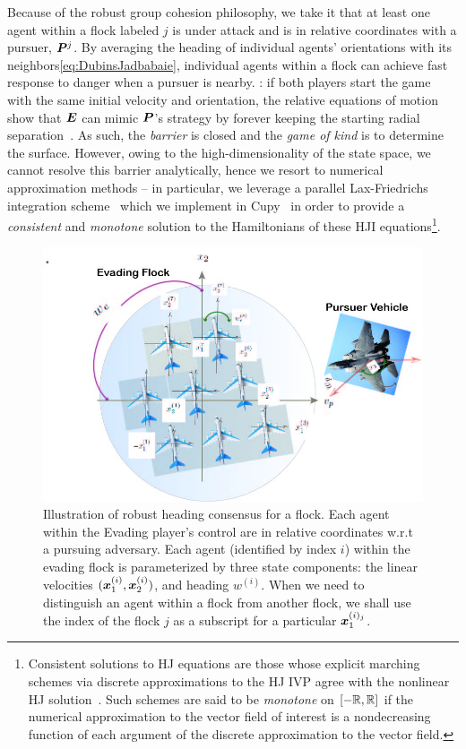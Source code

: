 Because of the robust group cohesion philosophy, we take it that at least one agent within a flock labeled $j$ is under attack and is in relative coordinates with a pursuer, $\bm{P}^j$. By averaging the heading of individual agents' orientations with its neighbors\cf \eqref{eq:DubinsJadbabaie}, individual agents within a flock can achieve  fast  response to danger when a pursuer is nearby. : if both players start the game with the same initial velocity and orientation, the relative equations of motion show that $\bm{E}$ can mimic $\bm{P}$'s strategy by forever keeping the starting radial separation~\cite{Merz1972}. As such, the \textit{barrier} is closed and the \textit{game of kind} is to determine the surface. However, owing to the high-dimensionality of the state space, we cannot resolve this barrier analytically, hence we resort to numerical approximation methods -- in particular, we leverage a parallel Lax-Friedrichs integration scheme~\cite{Crandall1984} which we implement in Cupy~\cite{CuPy} in order to provide a \textit{consistent} and \textit{monotone} solution to the Hamiltonians of these HJI equations\footnote{Consistent solutions to HJ equations are those whose explicit marching schemes via discrete  approximations to the HJ IVP agree with the nonlinear HJ solution~\cite{Crandall1984Approx}. Such schemes are said to be \textit{monotone} \eg on $\left[-\mathbb{R}, \mathbb{R}\right]$ if the numerical approximation to the vector field of interest is a nondecreasing function of each argument of the discrete approximation to the vector field.}. 
%
\begin{figure}[tb!]
\centering
\includegraphics[width=\columnwidth]{figures/flock_pursuer.jpg}
\caption{Illustration of robust heading consensus for a flock. Each agent within the Evading player's control are in relative coordinates w.r.t a pursuing adversary. Each agent (identified by index $i$) within the evading flock is parameterized by three state components: the linear velocities $(\bm{x}_1^{(i)}, \bm{x}_2^{(i)})$, and heading $w^{(i)}$. When we need to distinguish an agent within a flock from another flock, we shall use the index of the flock \eg $j$ as a subscript for a particular \eg  $\bm{x}_1^{(i)_j}$.}
\label{fig:robust_heading}
\end{figure}

